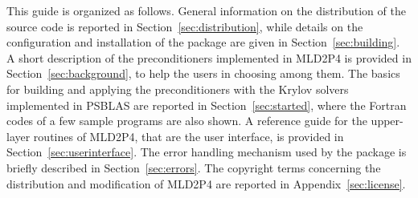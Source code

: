 This guide is organized as follows. General information on the distribution of the source code
is reported in Section~\ref{sec:distribution}, while details on the configuration
and installation of the package are given in Section~\ref{sec:building}. A short description of
the preconditioners implemented in MLD2P4 is provided
in Section~\ref{sec:background}, to help the users in choosing among them.
The basics for building and applying the preconditioners
with the Krylov solvers implemented in PSBLAS are reported in Section~\ref{sec:started}, where the
Fortran codes of a few sample programs are also shown. A reference guide for
the upper-layer routines of MLD2P4, that are the user interface, is provided
in Section~\ref{sec:userinterface}. The error handling mechanism used by the package is briefly described
in Section~\ref{sec:errors}. The copyright terms concerning the distribution and modification
of MLD2P4 are reported in Appendix~\ref{sec:license}.

